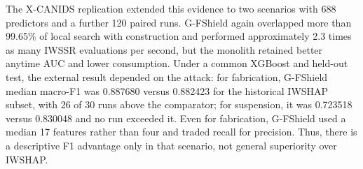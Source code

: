 The X-CANIDS replication extended this evidence to two scenarios with 688 predictors and a further 120 paired runs. G-FShield again overlapped more than 99.65\% of local search with construction and performed approximately 2.3 times as many IWSSR evaluations per second, but the monolith retained better anytime AUC and lower consumption. Under a common XGBoost and held-out test, the external result depended on the attack: for fabrication, G-FShield median macro-F1 was 0.887680 versus 0.882423 for the historical IWSHAP subset, with 26 of 30 runs above the comparator; for suspension, it was 0.723518 versus 0.830048 and no run exceeded it. Even for fabrication, G-FShield used a median 17 features rather than four and traded recall for precision. Thus, there is a descriptive F1 advantage only in that scenario, not general superiority over IWSHAP.
